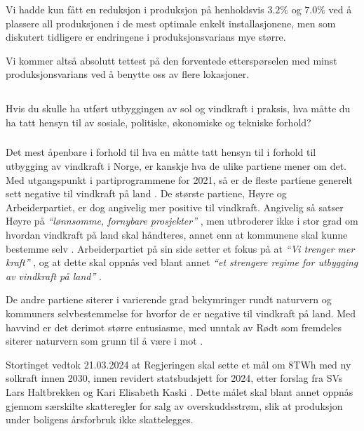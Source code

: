 \documentclass{article}
\begin{document}
Vi hadde kun fått en reduksjon i produksjon på henholdsvis $3.2\%$ og $7.0\%$ ved å plassere all produksjonen i de mest optimale enkelt installasjonene, men som diskutert tidligere er endringene i produksjonsvarians mye større.

Vi kommer altså absolutt tettest på den forventede etterspørselen med minst produksjonsvarians ved å benytte oss av flere lokasjoner.

\newpage
\subsection{}
Hvis du skulle ha utført utbyggingen av sol og vindkraft i praksis, hva måtte du ha tatt hensyn til av sosiale, politiske, økonomiske og tekniske forhold?

\subsubsection{}
Det mest åpenbare i forhold til hva en måtte tatt hensyn til i forhold til utbygging av vindkraft i Norge, er kanskje hva de ulike partiene mener om det.
Med utgangspunkt i partiprogrammene for 2021, så er de fleste partiene generelt sett negative til vindkraft på land \cite{nrk_vindkraft}.
De største partiene, Høyre og Arbeiderpartiet, er dog angivelig mer positive til vindkraft.
Angivelig så satser Høyre på \textit{``lønnsomme, fornybare prosjekter''} \cite{nrk_vindkraft}, men utbroderer ikke i stor grad om hvordan vindkraft på land skal håndteres, annet enn at kommunene skal kunne bestemme selv \cite{høyre_vindkraft}.
Arbeiderpartiet på sin side setter et fokus på at \textit{``Vi trenger mer kraft''} \cite{ap_vindkraft}, og at dette skal oppnås ved blant annet \textit{``et strengere regime for utbygging av vindkraft på land''} \cite{nrk_vindkraft}.

De andre partiene siterer i varierende grad bekymringer rundt naturvern og kommuners selvbestemmelse for hvorfor de er negative til vindkraft på land.
Med havvind er det derimot større entusiasme, med unntak av Rødt som fremdeles siterer naturvern som grunn til å være i mot \cite{nrk_vindkraft}.

Stortinget vedtok 21.03.2024 at Regjeringen skal sette et mål om 8TWh med ny solkraft innen 2030, innen revidert statsbudsjett for 2024, etter forslag fra SVs Lars Haltbrekken og Kari Elisabeth Kaski \cite{representant_sol}.
Dette målet skal blant annet oppnås gjennom særskilte skatteregler for salg av overskuddsstrøm, slik at produksjon under boligens årsforbruk ikke skattelegges.
\end{document}
